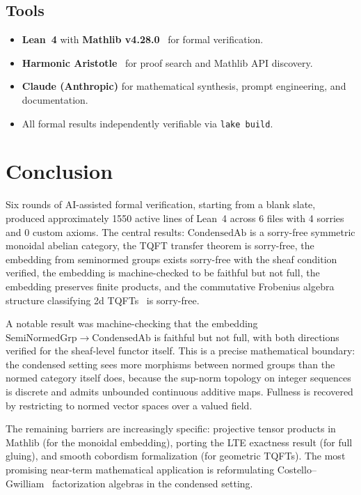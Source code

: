 \documentclass[11pt]{amsart}
\theoremstyle{plain}
\theoremstyle{definition}
\newcommand{\CondAb}{\mathrm{CondensedAb}}
\newcommand{\SemiNormedGrp}{\mathrm{SemiNormedGrp}}
\begin{document}
\subsection{Tools}
\begin{itemize}
\item \textbf{Lean~4} with \textbf{Mathlib v4.28.0}~\cite{Mathlib} for formal verification.
\item \textbf{Harmonic Aristotle}~\cite{Aristotle2025} for proof search and Mathlib API discovery.
\item \textbf{Claude (Anthropic)} for mathematical synthesis, prompt engineering, and documentation.
\item All formal results independently verifiable via \texttt{lake build}.
\end{itemize}

\section{Conclusion}
\label{sec:conclusion}

Six rounds of AI-assisted formal verification, starting from a blank slate, produced approximately 1550 active lines of Lean~4 across 6 files with 4 sorries and 0 custom axioms. The central results: $\CondAb$ is a sorry-free symmetric monoidal abelian category, the TQFT transfer theorem is sorry-free, the embedding from seminormed groups exists sorry-free with the sheaf condition verified, the embedding is machine-checked to be faithful but not full, the embedding preserves finite products, and the commutative Frobenius algebra structure classifying 2d TQFTs~\cite{Kock2003} is sorry-free.

A notable result was machine-checking that the embedding $\SemiNormedGrp \to \CondAb$ is faithful but not full, with both directions verified for the sheaf-level functor itself. This is a precise mathematical boundary: the condensed setting sees more morphisms between normed groups than the normed category itself does, because the sup-norm topology on integer sequences is discrete and admits unbounded continuous additive maps. Fullness is recovered by restricting to normed vector spaces over a valued field.

The remaining barriers are increasingly specific: projective tensor products in Mathlib (for the monoidal embedding), porting the LTE exactness result (for full gluing), and smooth cobordism formalization (for geometric TQFTs). The most promising near-term mathematical application is reformulating Costello--Gwilliam~\cite{CostelloGwilliam2017} factorization algebras in the condensed setting.
\end{document}
